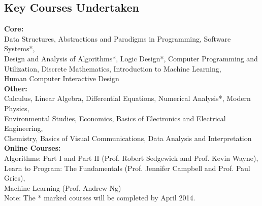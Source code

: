 \documentclass[margin,11pt]{resume}
\begin{document}
\begin{resume}
    \section{\mysidestyle Key Courses Undertaken} 

	\textbf{Core:} \\ Data Structures, Abstractions and Paradigms in Programming, Software Systems*, \\ Design and Analysis of Algorithms*, Logic Design*, Computer Programming and Utilization, Discrete Mathematics, Introduction to Machine Learning,\\ Human Computer Interactive Design \\
	\textbf{Other:} \\ Calculus, Linear Algebra, Differential Equations, Numerical Analysis*, Modern Physics, \\ Environmental Studies, Economics, Basics of Electronics and Electrical Engineering, \\ Chemistry, Basics of Visual Communications, Data Analysis and Interpretation\\
	\textbf{Online Courses:} \\ Algorithms: Part I and Part II (Prof. Robert Sedgewick and Prof. Kevin Wayne), \\ Learn to Program: The Fundamentals (Prof. Jennifer Campbell and Prof. Paul Gries), \\ Machine Learning (Prof. Andrew Ng)
\vspace{1mm}\\%
	Note: The * marked courses will be completed by April 2014.


\end{resume}
\end{document}

